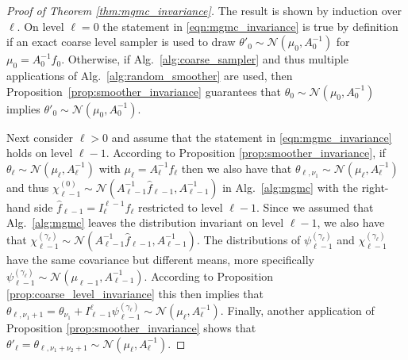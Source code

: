 \documentclass[11pt,english]{article}
\theoremstyle{plain}
\theoremstyle{plain}
\theoremstyle{plain}
\theoremstyle{plain}
\numberwithin{equation}{section}
\begin{document}
\begin{proof}[Proof of Theorem \ref{thm:mgmc_invariance}]
	The result is shown by induction over $\ell$. On level $\ell=0$ the statement in \eqref{eqn:mgmc_invariance} is true by definition if an exact coarse level sampler is used to draw $\theta'_0\sim \mathcal{N}(\mu_0,A_0^{-1})$ for $\mu_0=A_0^{-1}f_0$. Otherwise, if Alg.~\ref{alg:coarse_sampler} and thus multiple applications
	of Alg.~\ref{alg:random_smoother} are used, then
	Proposition~\ref{prop:smoother_invariance} guarantees that $\theta_0 \sim \mathcal{N}(\mu_0,A_0^{-1})$ implies $\theta'_0\sim \mathcal{N}(\mu_0,A_0^{-1})$.

	Next consider $\ell>0$ and assume that the statement in \eqref{eqn:mgmc_invariance} holds on level $\ell-1$. According to Proposition \ref{prop:smoother_invariance}, if $\theta_\ell \sim\mathcal{N}(\mu_\ell,A_\ell^{-1})$ with $\mu_\ell=A_\ell^{-1}f_\ell$ then we also have that $\theta_{\ell,\nu_1}\sim\mathcal{N}(\mu_\ell,A_\ell^{-1})$
	and thus $\chi_{\ell-1}^{(0)}\sim\mathcal{N}(A_{\ell-1}^{-1}\widehat{f}_{\ell-1},A_{\ell-1}^{-1})$ in Alg.~\ref{alg:mgmc} with the right-hand side $\widehat{f}_{\ell-1} = I_\ell^{\ell-1} f_\ell$ restricted to level $\ell-1$. Since we assumed that Alg.~\ref{alg:mgmc} leaves the distribution invariant on level $\ell-1$, we also have that $\chi_{\ell-1}^{(\gamma_\ell)}\sim\mathcal{N}(A_{\ell-1}^{-1}\widehat{f}_{\ell-1},A_{\ell-1}^{-1})$. The distributions of $\psi_{\ell-1}^{(\gamma_\ell)}$ and $\chi_{\ell-1}^{(\gamma_\ell)}$ have the same covariance but different means, more specifically $\psi_{\ell-1}^{(\gamma_\ell)}\sim\mathcal{N}(\mu_{\ell-1},A_{\ell-1}^{-1})$. According to Proposition \ref{prop:coarse_level_invariance} this then implies that $\theta_{\ell,\nu_1+1}=\theta_{\nu_1}+I_{\ell-1}^{\ell}\psi_{\ell-1}^{(\gamma_\ell)} \sim \mathcal{N}(\mu_\ell,A_\ell^{-1})$. Finally, another application of Proposition \ref{prop:smoother_invariance} shows that $\theta'_{\ell} =\theta_{\ell,\nu_1+\nu_2+1}\sim \mathcal{N}(\mu_\ell,A_\ell^{-1})$.
\end{proof}
\end{document}
